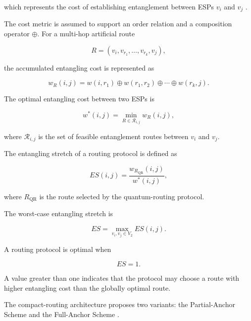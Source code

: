 which represents the cost of establishing entanglement between ESPs $v_i$ and $v_j$ \cite{caleffi2025quantumarchitecture}.

The cost metric is assumed to support an order relation and a composition operator $\oplus$. For a multi-hop artificial route

\begin{equation}
    R =
    \left(
    v_i,
    v_{r_1},
    \ldots,
    v_{r_k},
    v_j
    \right),
\end{equation}

the accumulated entangling cost is represented as

\begin{equation}
    w_R(i,j)
    =
    w(i,r_1)
    \oplus
    w(r_1,r_2)
    \oplus
    \cdots
    \oplus
    w(r_k,j).
\end{equation}

The optimal entangling cost between two ESPs is

\begin{equation}
    w^{*}(i,j)
    =
    \min_{R \in \mathcal{R}_{i,j}}
    w_R(i,j),
\end{equation}

where $\mathcal{R}_{i,j}$ is the set of feasible entanglement routes between $v_i$ and $v_j$.

The entangling stretch of a routing protocol is defined as

\begin{equation}
    ES(i,j)
    =
    \frac
    {
    w_{R_{\mathrm{QR}}}(i,j)
    }
    {
    w^{*}(i,j)
    },
\end{equation}

where $R_{\mathrm{QR}}$ is the route selected by the quantum-routing protocol.

The worst-case entangling stretch is

\begin{equation}
    ES
    =
    \max_{v_i,v_j \in V_2}
    ES(i,j).
\end{equation}

A routing protocol is optimal when

\begin{equation}
    ES = 1.
\end{equation}

A value greater than one indicates that the protocol may choose a route with higher entangling cost than the globally optimal route.

The compact-routing architecture proposes two variants: the Partial-Anchor Scheme and the Full-Anchor Scheme \cite{caleffi2025quantumarchitecture}.

